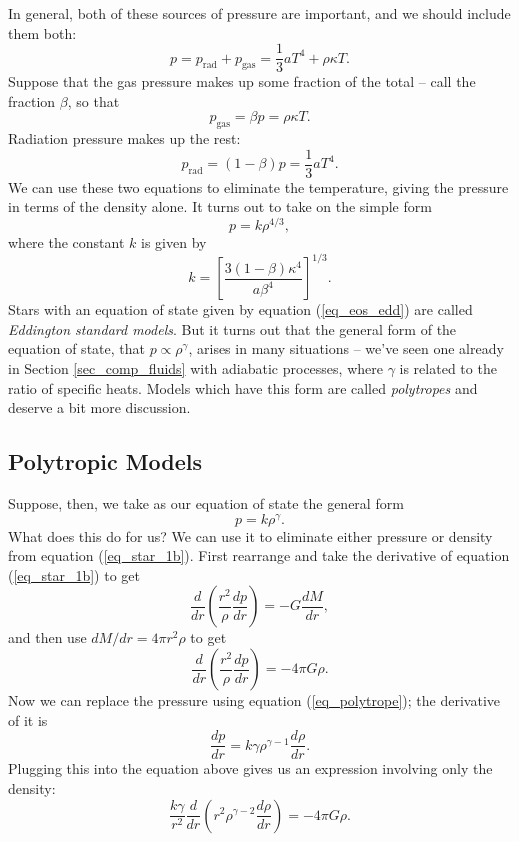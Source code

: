 In general, both of these sources of pressure are important, and we should include them both:
\begin{equation}
p = p_\text{rad} + p_\text{gas} = \frac{1}{3} aT^4 + \rho \kappa T.
\end{equation}
Suppose that the gas pressure makes up some fraction of the total -- call the fraction $\beta$, so that
\[
p_\text{gas} = \beta p = \rho \kappa T.
\]
Radiation pressure makes up the rest:
\[
p_\text{rad} = (1 - \beta) p = \frac{1}{3} aT^4.
\]
We can use these two equations to eliminate the temperature, giving the pressure in terms of the density alone.  It turns out to take on the simple form
\begin{equation}
\label{eq_eos_edd}
p = k \rho^{4/3},
\end{equation}
where the constant $k$ is given by
\[
k = \left[ \frac{3 (1-\beta) \kappa^4}{a \beta^4} \right]^{1/3}.
\]
Stars with an equation of state given by equation (\ref{eq_eos_edd}) are called \emph{Eddington standard models}.  But it turns out that the general form of the equation of state, that $p \propto \rho^\gamma$, arises in many situations -- we've seen one already in Section \ref{sec_comp_fluids} with adiabatic processes, where $\gamma$ is related to the ratio of specific heats.  Models which have this form are called \emph{polytropes} and deserve a bit more discussion.

\subsection{Polytropic Models}

Suppose, then, we take as our equation of state the general form
\begin{equation}
\label{eq_polytrope}
p = k \rho^\gamma.
\end{equation}
What does this do for us?  We can use it to eliminate either pressure or density from equation (\ref{eq_star_1b}).  First rearrange and take the derivative of equation (\ref{eq_star_1b}) to get
\[
\frac{d}{dr} \left( \frac{r^2}{\rho} \frac{dp}{dr} \right) = -G \frac{dM}{dr},
\]
and then use $dM/dr = 4\pi r^2 \rho$ to get
\[
\frac{d}{dr} \left( \frac{r^2}{\rho} \frac{dp}{dr} \right) = - 4 \pi G \rho.
\]
Now we can replace the pressure using equation (\ref{eq_polytrope}); the derivative of it is
\[
\frac{dp}{dr} = k \gamma \rho^{\gamma - 1} \frac{d\rho}{dr}.
\]
Plugging this into the equation above gives us an expression involving only the density:
\begin{equation}
\label{eq_star_density}
\frac{k\gamma}{r^2} \frac{d}{dr} \left( r^2 \rho^{\gamma - 2} \frac{d\rho}{dr} \right) = -4\pi G \rho.
\end{equation}

